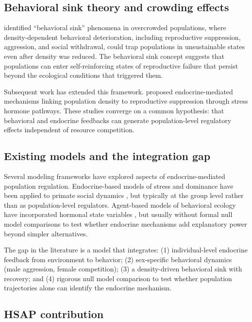 \subsection{Behavioral sink theory and crowding effects}

\citet{calhoun1962} identified ``behavioral sink'' phenomena in overcrowded populations, where density-dependent behavioral deterioration, including reproductive suppression, aggression, and social withdrawal, could trap populations in unsustainable states even after density was reduced. The behavioral sink concept suggests that populations can enter self-reinforcing states of reproductive failure that persist beyond the ecological conditions that triggered them.

Subsequent work has extended this framework. \citet{christian1964endocrines} proposed endocrine-mediated mechanisms linking population density to reproductive suppression through stress hormone pathways. These studies converge on a common hypothesis: that behavioral and endocrine feedbacks can generate population-level regulatory effects independent of resource competition.

\subsection{Existing models and the integration gap}

Several modeling frameworks have explored aspects of endocrine-mediated population regulation. Endocrine-based models of stress and dominance have been applied to primate social dynamics \citep{sapolsky2005}, but typically at the group level rather than as population-level regulators. Agent-based models of behavioral ecology have incorporated hormonal state variables \citep{higham2013endocrinology}, but usually without formal null model comparisons to test whether endocrine mechanisms add explanatory power beyond simpler alternatives.

The gap in the literature is a model that integrates: (1) individual-level endocrine feedback from environment to behavior; (2) sex-specific behavioral dynamics (male aggression, female competition); (3) a density-driven behavioral sink with recovery; and (4) rigorous null model comparison to test whether population trajectories alone can identify the endocrine mechanism.

\subsection{HSAP contribution}


